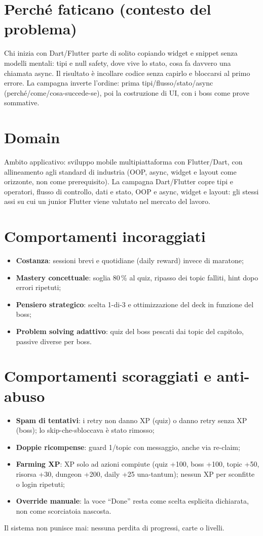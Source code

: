 \section{Perch\'e faticano (contesto del problema)}
Chi inizia con Dart/Flutter parte di solito copiando widget e snippet
senza modelli mentali: tipi e null safety, dove vive lo stato, cosa fa
davvero una chiamata async. Il risultato \`e incollare codice senza
capirlo e bloccarsi al primo errore. La campagna inverte l'ordine:
prima tipi/flusso/stato/async (perch\'e/come/cosa-succede-se), poi la
costruzione di UI, con i boss come prove sommative.

\section{Domain}
Ambito applicativo: sviluppo mobile multipiattaforma con Flutter/Dart,
con allineamento agli standard di industria (OOP, async, widget e
layout come orizzonte, non come prerequisito). La campagna Dart/Flutter
copre tipi e operatori, flusso di controllo, dati e stato, OOP e async,
widget e layout: gli stessi assi su cui un junior Flutter viene
valutato nel mercato del lavoro.

\section{Comportamenti incoraggiati}
\begin{itemize}
\item \textbf{Costanza}: sessioni brevi e quotidiane (daily reward) invece
di maratone;
\item \textbf{Mastery concettuale}: soglia 80\,\% al quiz, ripasso dei
topic falliti, hint dopo errori ripetuti;
\item \textbf{Pensiero strategico}: scelta 1-di-3 e ottimizzazione del
deck in funzione del boss;
\item \textbf{Problem solving adattivo}: quiz del boss pescati dai topic
del capitolo, passive diverse per boss.
\end{itemize}

\section{Comportamenti scoraggiati e anti-abuso}
\begin{itemize}
\item \textbf{Spam di tentativi}: i retry non danno XP (quiz) o danno
retry senza XP (boss); lo skip-che-sbloccava \`e stato rimosso;
\item \textbf{Doppie ricompense}: guard 1/topic con messaggio, anche via
re-claim;
\item \textbf{Farming XP}: XP solo ad azioni compiute (quiz +100,
boss +100, topic +50, risorsa +30, dungeon +200, daily +25 una-tantum);
nessun XP per sconfitte o login ripetuti;
\item \textbf{Override manuale}: la voce ``Done'' resta come scelta
esplicita dichiarata, non come scorciatoia nascosta.
\end{itemize}
Il sistema non punisce mai: nessuna perdita di progressi, carte o livelli.

